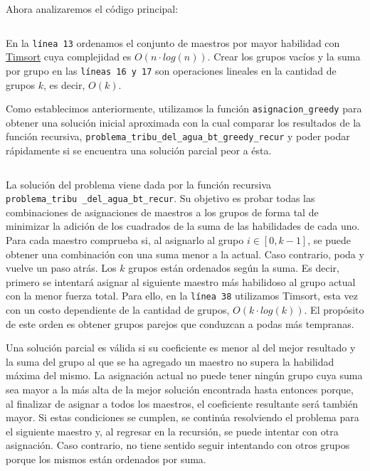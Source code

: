 \documentclass{article}
\begin{document}
Ahora analizaremos el código principal:
\inputminted[linenos, lastline=28]{python}{codigo/backtracking_con_greedy.py}

En la \texttt{línea 13} ordenamos el conjunto de maestros por mayor habilidad con \href{https://svn.python.org/projects/python/trunk/Objects/listsort.txt}{Timsort} cuya complejidad es $O(n \cdot log(n))$. Crear los grupos vacíos y la suma por grupo en las \texttt{líneas 16 y 17} son operaciones lineales en la cantidad de grupos $k$, es decir, $O(k)$. 

Como establecimos anteriormente, utilizamos la función \texttt{asignacion\_greedy} para obtener una solución inicial aproximada con la cual comparar los resultados de la función recursiva, \texttt{problema\_tribu\_del\_agua\_bt\_greedy\_recur} y poder podar rápidamente si se encuentra una solución parcial peor a ésta.

\inputminted[linenos, firstline=30, lastline=71]{python}{codigo/backtracking_con_greedy.py}

La solución del problema viene dada por la función recursiva \texttt{problema\_tribu\
\_del\_agua\_bt\_recur}.  Su objetivo es probar todas las combinaciones de asignaciones de maestros a los grupos de forma tal de minimizar la adición de los cuadrados de la suma de las habilidades de cada uno. Para cada maestro comprueba si, al asignarlo al grupo $i \in [0, k-1]$, se puede obtener una combinación con una suma menor a la actual. Caso contrario, poda y vuelve un paso atrás. Los $k$ grupos están ordenados según la suma. Es decir, primero se intentará asignar al siguiente maestro más habilidoso al grupo actual con la menor fuerza total. Para ello, en la \texttt{línea 38} utilizamos Timsort, esta vez con un costo dependiente de la cantidad de grupos, $O(k \cdot log(k))$. El propósito de este orden es obtener grupos parejos que conduzcan a podas más tempranas.

Una solución parcial es válida si su coeficiente es menor al del mejor resultado y la suma del grupo al que se ha agregado un maestro no supera la habilidad máxima del mismo. La asignación actual no puede tener ningún grupo cuya suma sea mayor a la más alta de la mejor solución encontrada hasta entonces porque, al finalizar de asignar a todos los maestros, el coeficiente resultante será también mayor. Si estas condiciones se cumplen, se continúa resolviendo el problema para el siguiente maestro y, al regresar en la recursión, se puede intentar con otra asignación. Caso contrario, no tiene sentido seguir intentando con otros grupos porque los mismos están ordenados por suma.
\end{document}
